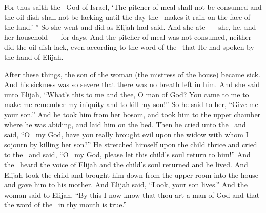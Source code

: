 \begin{inparaenum}
   For thus saith the \lord\ God of Israel, `The pitcher of meal shall not be consumed and the oil dish shall not be lacking until the day the \lord\ makes it rain on the face of the land.' ''%
   So she went and did as Elijah had said. And she ate~--- she, he, and her household~--- for days.%
   And the pitcher of meal was not consumed, neither did the oil dish lack, even according to the word of the \lord\ that He had spoken by the hand of Elijah.%
  
   After these things, the son of the woman (the mistress of the house) became sick. And his sickness was so severe that there was no breath left in him.%
   And she said unto Elijah, ``What's this to me and thee, O man of God? You came to me to make me remember my iniquity and to kill my son!''%
   So he said to her, ``Give me your son.'' And he took him from her bosom, and took him to the upper chamber where he was abiding, and laid him on the bed.%
   Then he cried unto the \lord\ and said, ``O \lord\ my God, have you really brought evil upon the widow with whom I sojourn by killing her son?''%
   He stretched himself upon the child thrice and cried to the \lord\ and said, ``O \lord\ my God, please let this child's soul return to him!''%
   And the \lord\ heard the voice of Elijah and the child's soul returned and he lived.%
   And Elijah took the child and brought him down from the upper room into the house and gave him to his mother. And Elijah said, ``Look, your son lives.''%
   And the woman said to Elijah, ``By this I now know that thou art a man of God and that the word of the \lord\ in thy mouth is true.''%
\end{inparaenum}
